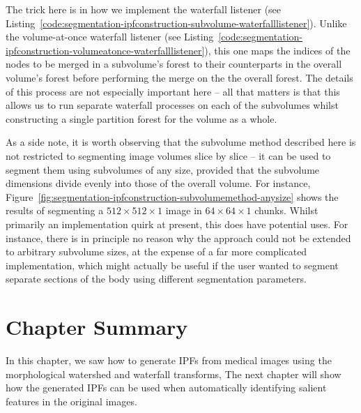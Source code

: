The trick here is in how we implement the waterfall listener (see Listing~\ref{code:segmentation-ipfconstruction-subvolume-waterfalllistener}). Unlike the volume-at-once waterfall listener (see Listing~\ref{code:segmentation-ipfconstruction-volumeatonce-waterfalllistener}), this one maps the indices of the nodes to be merged in a subvolume's forest to their counterparts in the overall volume's forest before performing the merge on the the overall forest. The details of this process are not especially important here -- all that matters is that this allows us to run separate waterfall processes on each of the subvolumes whilst constructing a single partition forest for the volume as a whole.

As a side note, it is worth observing that the subvolume method described here is not restricted to segmenting image volumes slice by slice -- it can be used to segment them using subvolumes of any size, provided that the subvolume dimensions divide evenly into those of the overall volume. For instance, Figure~\ref{fig:segmentation-ipfconstruction-subvolumemethod-anysize} shows the results of segmenting a $512 \times 512 \times 1$ image in $64 \times 64 \times 1$ chunks. Whilst primarily an implementation quirk at present, this does have potential uses. For instance, there is in principle no reason why the approach could not be extended to arbitrary subvolume sizes, at the expense of a far more complicated implementation, which might actually be useful if the user wanted to segment separate sections of the body using different segmentation parameters.


\newpage

\section{Chapter Summary}

In this chapter, we saw how to generate IPFs from medical images using the morphological watershed and waterfall transforms, 
%
\noindent The next chapter will show how the generated IPFs can be used when automatically identifying salient features in the original images.